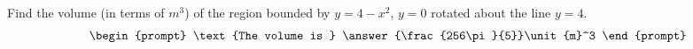 \documentclass{ximera}
\author{Gregory Hartman \and Matthew Carr}
\begin{document}
\begin{exercise}






Find the volume (in terms of $\unit{m}^3$) of the region bounded by $y=4-x^2$, $y=0$ rotated about the line $y=4$.
\[
\begin{prompt}
\text{The volume is } \answer{\frac{256\pi}{5}}\unit{m}^3
\end{prompt}
\]




\end{exercise}
\end{document}
